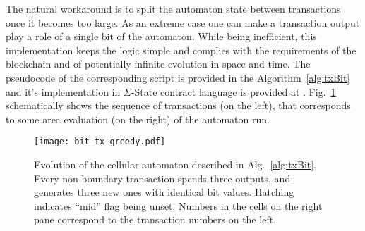 \documentclass[runningheads]{llncs}
\begin{document}
    The natural workaround is to split the automaton state between
    transactions once it becomes too large. As an extreme case one can make a
    transaction output play a role of a single bit of the automaton. While being
    inefficient, this implementation keeps the logic simple and complies with the
    requirements of the blockchain and of potentially infinite evolution in
    space and time. The pseudocode of the corresponding script is
    provided in the Algorithm~\ref{alg:txBit} and it's implementation in $\Sigma$-State
    contract language is provided at \cite{ergoScript2}. Fig.~\ref{fig:bit_txs}
    schematically shows the sequence of transactions (on the left), that corresponds
    to some area evaluation (on the right) of the automaton run.
    \begin{figure}[h]
        \centering
        \texttt{[image: bit\_tx\_greedy.pdf]}
        \caption{Evolution of the cellular automaton described in
            Alg.~\ref{alg:txBit}. Every non-boundary transaction spends three
            outputs, and generates three new ones with identical bit values.
            Hatching indicates ``mid'' flag being unset. Numbers in the cells on
            the right pane correspond to the transaction numbers on the left.
        \label{fig:bit_txs} }
    \end{figure}
\end{document}

